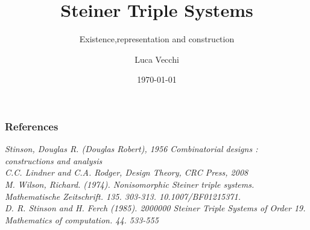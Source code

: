 \documentclass{beamer}
\title{Steiner Triple Systems}
\subtitle{Existence,representation and construction}
\author{Luca Vecchi}
\institute{University of Milan}
\date{\today}
\begin{document}
	\begin{frame}
	\titlepage
	\end{frame}
	
	
	
	
	
	
	
	
	
	
	


	\begin{frame}
	\frametitle{References}
	
	\textit{Stinson, Douglas R. (Douglas Robert), 1956 	Combinatorial designs : constructions and analysis}\\
	\textit{C.C. Lindner and C.A. Rodger, Design Theory, CRC Press, 2008}\\
	\textit{M. Wilson, Richard. (1974). Nonisomorphic Steiner triple systems. Mathematische Zeitschrift. 135. 303-313. 10.1007/BF01215371. }\\
	\textit{D. R. Stinson and H. Ferch (1985). 2000000 Steiner Triple Systems of Order 19. Mathematics of computation. 44. 533-555}
	\end{frame}
\end{document}

